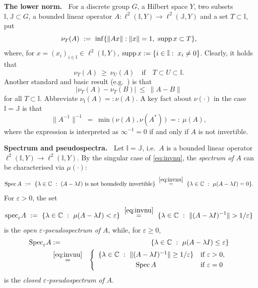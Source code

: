 \documentclass{article}
\newcommand\C{{\mathbb C}}
\newcommand\I{{\mathbb I}}
\newcommand\J{{\mathbb J}}
\newcommand\eps{{\varepsilon}}
\newcommand\speps{{\rm spec}_\eps}
\newcommand\Spec{{\rm Spec}\,}  %
\newcommand\Speps{{\rm Spec}_\eps}
\newcommand\supp{{\rm supp\,}}
\numberwithin{equation}{section}   %
\numberwithin{figure}{section}  %
\begin{document}
\medskip\noindent
{\bf The lower norm.\ }
For a discrete group $G$, a Hilbert space $Y$, two subsets $\I,\J\subset G$, a bounded linear operator $A:\ell^2(\I,Y)\to\ell^2(\J,Y)$ and a set $T\subset \I$, put
\[
\nu_T(A)\ :=\ \inf\{\|Ax\|:\|x\|=1,\ \supp x\subset T\},
\]
where, for $x=(x_i)_{i\in \I}\in\ell^2(\I,Y)$, $\supp x:=\{i\in \I:\; x_i\ne 0\}$. Clearly, it holds that
\begin{equation}\label{eq:numon}
\nu_{T}(A)\ \ge\ \nu_{U}(A)
\quad\text{if}\quad
T\subset U\subset \I.
\end{equation}
Another standard and basic result (e.g.~\cite[Lemma 2.38]{LiBook}) is that
\begin{equation} \label{eq:Lipschitz}
|\nu_T(A)-\nu_T(B)|\ \le\ \|A-B\|
\end{equation}
for all $T\subset \I$. Abbreviate $\nu_\I(A)=:\nu(A)$.
%
%
A key fact about $\nu(\cdot)$ in the case $\I=\J$ is that
\begin{equation} \label{eq:invnu}
\|A^{-1}\|^{-1}\ =\ \min\big(\,\nu(A),\nu(A^*)\,\big)\ =:\ \mu(A),
\end{equation}
where the expression is interpreted as $\infty^{-1}=0$ if and only if $A$ is not invertible.



\medskip\noindent
{\bf Spectrum and pseudospectra.\ }
Let $\I=\J$, i.e.~$A$ is a bounded linear operator $\ell^2(\I,Y)\to\ell^2(\I,Y)$.
By the singular case of \eqref{eq:invnu}, the {\sl spectrum of $A$} can be characterised via $\mu(\cdot)$:
\[
\Spec A\ :=\ \{\lambda\in\C\ :\ (A-\lambda I)\text{ is not boundedly invertible}\}\ \stackrel{\eqref{eq:invnu}}=\ \{\lambda\in\C\ :\ \mu(A-\lambda I)=0\}.
\]
For $\eps>0$, the set
\begin{equation} \label{eq:speps}
\speps A\ :=\ \{\lambda\in\C\ :\ \mu(A-\lambda I)<\eps\}\ \stackrel{\eqref{eq:invnu}}=\ \{\lambda\in\C\ :\ \|(A-\lambda I)^{-1}\|>1/\eps\}
\end{equation}
is the {\sl open $\eps$-pseudospectrum of $A$}, while, for $\eps\ge 0$,
\begin{eqnarray}
\Speps A &:=& \{\lambda\in\C\ :\ \mu(A-\lambda I)\le\eps\}\label{eq:Speps}\\
&\stackrel{\eqref{eq:invnu}}=&
\left\{\begin{array}{cl}
\{\lambda\in\C\ :\ \|(A-\lambda I)^{-1}\|\ge 1/\eps\}&\text{if } \eps>0,\\[1mm]
\Spec A&\text{if } \eps=0
\end{array}\right. \nonumber
\end{eqnarray}
is the {\sl closed $\eps$-pseudospectrum of $A$}.
\end{document}
